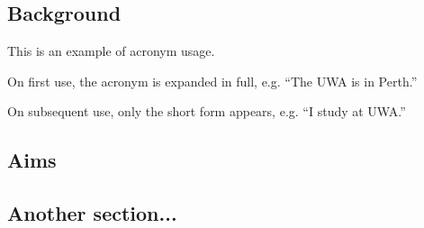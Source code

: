 \subsection{Background}
This is an example of acronym usage. 

On first use, the acronym is expanded in full, e.g.  
“The \gls{UWA} is in Perth.”  

On subsequent use, only the short form appears, e.g.  
“I study at \gls{UWA}.”


\subsection{Aims}

\subsection{Another section...}
